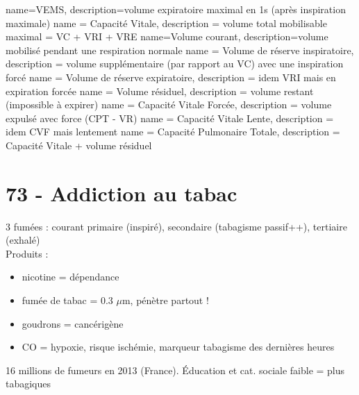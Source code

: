 %


{
  name={VEMS}, 
  description={volume expiratoire maximal en 1s (après inspiration maximale)}
}
{ name = Capacité Vitale,
  description = volume total mobilisable maximal = VC + VRI + VRE
}
{ name=Volume courant,
  description={volume mobilisé pendant une respiration normale}
}
{ name = Volume de réserve inspiratoire,
  description = volume supplémentaire (par rapport au VC) avec
    une inspiration forcé
}
{ name = Volume de réserve expiratoire,
  description = idem VRI mais en expiration forcée
}
{ name = Volume résiduel,
  description = volume restant (impossible à expirer)
}
{ name = Capacité Vitale Forcée,
  description = volume expulsé avec force (CPT - VR)
}
{ name = Capacité Vitale Lente,
  description = idem CVF mais lentement
}  
{ name = {Capacité Pulmonaire Totale},
  description = {Capacité Vitale + volume résiduel}
}

\glsaddall %
\glsunsetall %


\section{73 - Addiction au tabac}
3 fumées : courant primaire (inspiré), secondaire (tabagisme passif++), tertiaire (exhalé)\\
Produits :
\begin{itemize}
\item nicotine = dépendance
\item fumée de tabac = 0.3 $\mu$m, pénètre partout !
\item goudrons = cancérigène
\item CO = hypoxie, risque ischémie, marqueur tabagisme des dernières heures
\end{itemize}
16 millions de fumeurs en 2013 (France). Éducation et cat. sociale faible = plus
tabagiques
